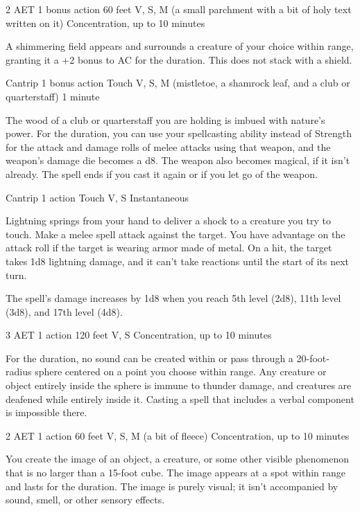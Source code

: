 \label{spell:shield-of-faith}
{2 AET}
{1 bonus action}
{60 feet}
{V, S, M (a small parchment with a bit of holy text written on it)}
{Concentration, up to 10 minutes}

A shimmering field appears and surrounds a creature of your choice within range, granting it a +2 bonus to AC for the duration. This does not stack with a shield.

\label{spell:shillelagh}
{Cantrip}
{1 bonus action}
{Touch}
{V, S, M (mistletoe, a shamrock leaf, and a club or quarterstaff)}
{1 minute}

The wood of a club or quarterstaff you are holding is imbued with nature's power. For the duration, you can use your spellcasting ability instead of Strength for the attack and damage rolls of melee attacks using that weapon, and the weapon's damage die becomes a d8. The weapon also becomes magical, if it isn't already. The spell ends if you cast it again or if you let go of the weapon.

\label{spell:shocking-grasp}
{Cantrip}
{1 action}
{Touch}
{V, S}
{Instantaneous}

Lightning springs from your hand to deliver a shock to a creature you try to touch. Make a melee spell attack against the target. You have advantage on the attack roll if the target is wearing armor made of metal. On a hit, the target takes 1d8 lightning damage, and it can't take reactions until the start of its next turn.

The spell's damage increases by 1d8 when you reach 5th level (2d8), 11th level (3d8), and 17th level (4d8).

\label{spell:silence}
{3 AET}
{1 action}
{120 feet}
{V, S}
{Concentration, up to 10 minutes}

For the duration, no sound can be created within or pass through a 20-foot-radius sphere centered on a point you choose within range. Any creature or object entirely inside the sphere is immune to thunder damage, and creatures are deafened while entirely inside it. Casting a spell that includes a verbal component is impossible there.

\label{spell:silent-image}
{2 AET}
{1 action}
{60 feet}
{V, S, M (a bit of fleece)}
{Concentration, up to 10 minutes}

You create the image of an object, a creature, or some other visible phenomenon that is no larger than a 15-foot cube. The image appears at a spot within range and lasts for the duration. The image is purely visual; it isn't accompanied by sound, smell, or other sensory effects.

